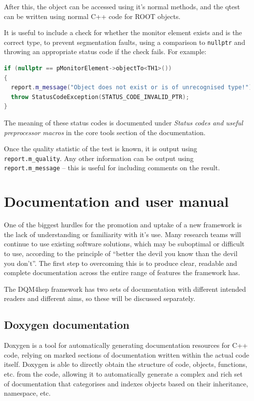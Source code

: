 After this, the object can be accessed using it's normal methods, and the \acrshort{qtest} can be written using normal C++ code for ROOT objects.

It is useful to include a check for whether the monitor element exists and is the correct type, to prevent segmentation faults, using a comparison to \texttt{nullptr} and throwing an appropriate status code if the check fails. For example:

\begin{lstlisting}[language=C++]
if (nullptr == pMonitorElement->objectTo<TH1>())
{
  report.m_message("Object does not exist or is of unrecognised type!");
  throw StatusCodeException(STATUS_CODE_INVALID_PTR);
}
\end{lstlisting}

The meaning of these status codes is documented under \textit{Status codes and useful preprocessor macros} in the core tools section of the documentation.

Once the quality statistic of the test is known, it is output using \texttt{report.m\_quality}. Any other information can be output using \texttt{report.m\_message} – this is useful for including comments on the result.

\section{Documentation and user manual} 
One of the biggest hurdles for the promotion and uptake of a new framework is the lack of understanding or familiarity with it's use. Many research teams will continue to use existing software solutions, which may be suboptimal or difficult to use, according to the principle of ``better the devil you know than the devil you don't''. The first step to overcoming this is to produce clear, readable and complete documentation across the entire range of features the framework has.

The \acrshort{DQM4hep} framework has two sets of documentation with different intended readers and different aims, so these will be discussed separately.

\subsection{Doxygen documentation}
Doxygen is a tool for automatically generating documentation resources for C++ code, relying on marked sections of documentation written within the actual code itself. Doxygen is able to directly obtain the structure of code, objects, functions, etc. from the code, allowing it to automatically generate a complex and rich set of documentation that categorises and indexes objects based on their inheritance, namespace, etc.

